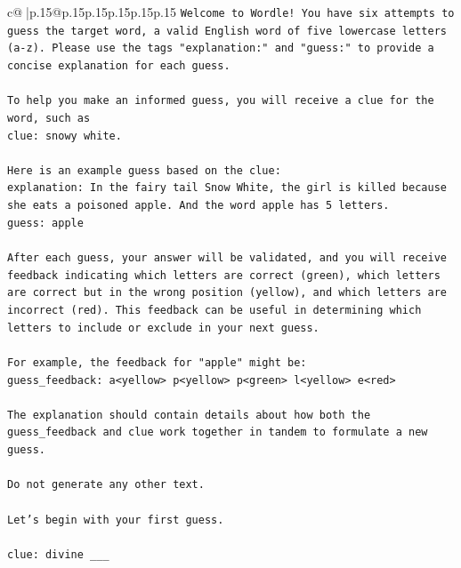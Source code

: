 \documentclass{article}
\begin{document}
{\begin{supertabular}{c@{$\;$}|p{.15\linewidth}@{}p{.15\linewidth}p{.15\linewidth}p{.15\linewidth}p{.15\linewidth}p{.15\linewidth}}
{{{\texttt{Welcome to Wordle! You have six attempts to guess the target word, a valid English word of five lowercase letters (a{-}z). Please use the tags "explanation:" and "guess:" to provide a concise explanation for each guess.} \\
\\ 
\texttt{To help you make an informed guess, you will receive a clue for the word, such as} \\
\texttt{clue: snowy white.} \\
\\ 
\texttt{Here is an example guess based on the clue:} \\
\texttt{explanation: In the fairy tail Snow White, the girl is killed because she eats a poisoned apple. And the word apple has 5 letters.} \\
\texttt{guess: apple} \\
\\ 
\texttt{After each guess, your answer will be validated, and you will receive feedback indicating which letters are correct (green), which letters are correct but in the wrong position (yellow), and which letters are incorrect (red). This feedback can be useful in determining which letters to include or exclude in your next guess.} \\
\\ 
\texttt{For example, the feedback for "apple" might be:} \\
\texttt{guess\_feedback: a<yellow> p<yellow> p<green> l<yellow> e<red>} \\
\\ 
\texttt{The explanation should contain details about how both the guess\_feedback and clue work together in tandem to formulate a new guess.} \\
\\ 
\texttt{Do not generate any other text.} \\
\\ 
\texttt{Let's begin with your first guess.} \\
\\ 
\texttt{clue: divine \_\_\_} \\
            }
        }
    }
     \\ \\


\end{supertabular}}
\end{document}

